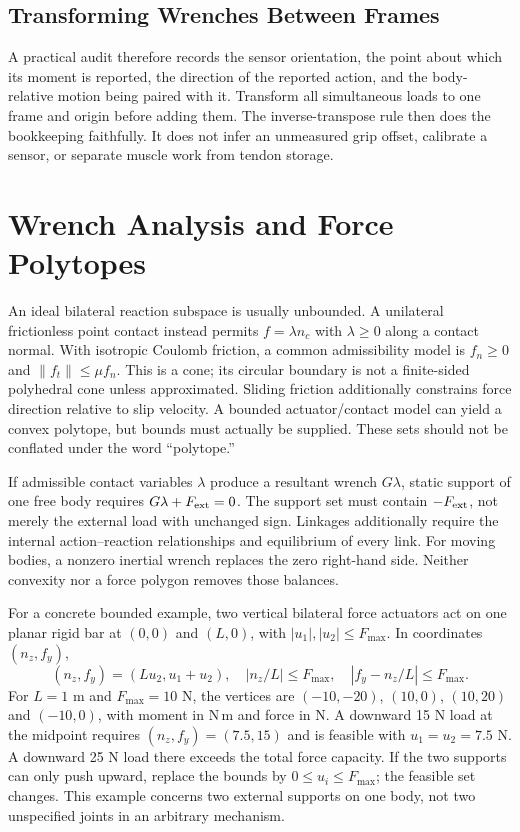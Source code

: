 \subsection{Transforming Wrenches Between Frames}

A practical audit therefore records the sensor orientation, the point about which its moment is reported, the direction of the reported action, and the body-relative motion being paired with it. Transform all simultaneous loads to one frame and origin before adding them. The inverse-transpose rule then does the bookkeeping faithfully. It does not infer an unmeasured grip offset, calibrate a sensor, or separate muscle work from tendon storage.

\section{Wrench Analysis and Force Polytopes}
\label{sec:wrench_analysis}
\label{ex:graphical_statics}

An ideal bilateral reaction subspace is usually unbounded. A unilateral frictionless point contact instead permits $f=\lambda n_c$ with $\lambda\geq0$ along a contact normal. With isotropic Coulomb friction, a common admissibility model is $f_n\geq0$ and $\|f_t\|\leq\mu f_n$. This is a cone; its circular boundary is not a finite-sided polyhedral cone unless approximated. Sliding friction additionally constrains force direction relative to slip velocity. A bounded actuator/contact model can yield a convex polytope, but bounds must actually be supplied. These sets should not be conflated under the word ``polytope.''

If admissible contact variables $\lambda$ produce a resultant wrench $G\lambda$, static support of one free body requires $G\lambda+F_{\rm ext}=0$. The support set must contain $-F_{\rm ext}$, not merely the external load with unchanged sign. Linkages additionally require the internal action--reaction relationships and equilibrium of every link. For moving bodies, a nonzero inertial wrench replaces the zero right-hand side. Neither convexity nor a force polygon removes those balances.

For a concrete bounded example, two vertical bilateral force actuators act on one planar rigid bar at $(0,0)$ and $(L,0)$, with $|u_1|,|u_2|\leq F_{\max}$. In coordinates $(n_z,f_y)$,
\begin{equation}
 (n_z,f_y)=(Lu_2,u_1+u_2),\quad
 |n_z/L|\leq F_{\max},\quad |f_y-n_z/L|\leq F_{\max}.
\end{equation}
For $L=1$ m and $F_{\max}=10$ N, the vertices are $(-10,-20)$, $(10,0)$, $(10,20)$ and $(-10,0)$, with moment in N\,m and force in N. A downward 15 N load at the midpoint requires $(n_z,f_y)=(7.5,15)$ and is feasible with $u_1=u_2=7.5$ N. A downward 25 N load there exceeds the total force capacity. If the two supports can only push upward, replace the bounds by $0\leq u_i\leq F_{\max}$; the feasible set changes. This example concerns two external supports on one body, not two unspecified joints in an arbitrary mechanism.

